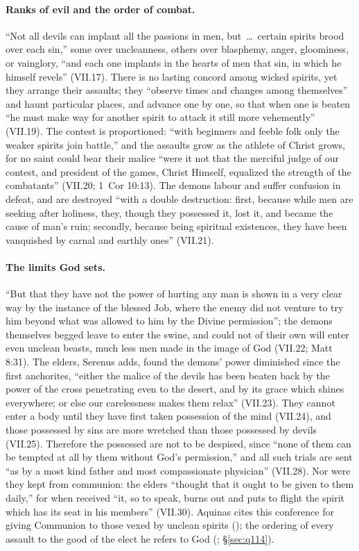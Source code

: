 \paragraph{Ranks of evil and the order of combat.} ``Not all devils can
implant all the passions in men, but~\dots\ certain spirits brood over
each sin,'' some over uncleanness, others over blasphemy, anger,
gloominess, or vainglory, ``and each one implants in the hearts of men
that sin, in which he himself revels'' (VII.17). There is no lasting
concord among wicked spirits, yet they arrange their assaults; they
``observe times and changes among themselves'' and haunt particular
places, and advance one by one, so that when one is beaten ``he must make
way for another spirit to attack it still more vehemently'' (VII.19). The
contest is proportioned: ``with beginners and feeble folk only the weaker
spirits join battle,'' and the assaults grow as the athlete of Christ
grows, for no saint could bear their malice ``were it not that the
merciful judge of our contest, and president of the games, Christ
Himself, equalized the strength of the combatants'' (VII.20; 1~Cor 10:13).
The demons labour and suffer confusion in defeat, and are destroyed ``with
a double destruction: first, because while men are seeking after
holiness, they, though they possessed it, lost it, and became the cause
of man's ruin; secondly, because being spiritual existences, they have
been vanquished by carnal and earthly ones'' (VII.21).

\paragraph{The limits God sets.} ``But that they have not the power of
hurting any man is shown in a very clear way by the instance of the
blessed Job, where the enemy did not venture to try him beyond what was
allowed to him by the Divine permission''; the demons themselves begged
leave to enter the swine, and could not of their own will enter even
unclean beasts, much less men made in the image of God (VII.22; Matt
8:31). The elders, Serenus adds, found the demons' power diminished since the first
anchorites, ``either the malice of the devils has been beaten back by the
power of the cross penetrating even to the desert, and by its grace which
shines everywhere; or else our carelessness makes them relax'' (VII.23).
They cannot enter a body until they have first taken possession of the
mind (VII.24), and those possessed by sins are more wretched than those
possessed by devils (VII.25). Therefore the possessed are not to be
despised, since ``none of them can be tempted at all by them without God's
permission,'' and all such trials are sent ``as by a most kind father and
most compassionate physician'' (VII.28). Nor were they kept from
communion: the elders ``thought that it ought to be given to them daily,''
for when received ``it, so to speak, burns out and puts to flight the
spirit which has its seat in his members'' (VII.30). Aquinas cites this
conference for giving Communion to those vexed by unclean spirits
(); the ordering of every assault to the good of
the elect he refers to God (; \S\ref{sec:q114}).

